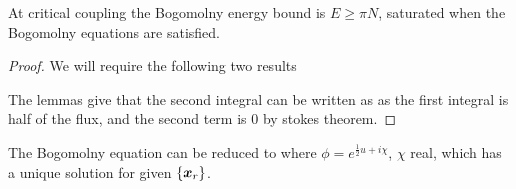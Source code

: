 \documentclass{article}
\begin{document}
\begin{prop}
At critical coupling the Bogomolny energy bound is $E \geq \pi N$, saturated when the Bogomolny equations
are satisfied.
\end{prop}
\begin{proof}
We will require the following two results 
\begin{lemma}
\end{lemma}
\begin{lemma}
\end{lemma}
The lemmas give that the second integral can be written as 
as the first integral is half of the flux, and the second term is 0 by stokes theorem. 
\end{proof}

\begin{theorem}
The Bogomolny equation can be reduced to 
where $\phi = e^{\frac{1}{2}u + i \chi}$, $\chi$ real, which has a unique solution for given $\left\{ \bm{x}_r \right\}$. 
\end{theorem}
\end{document}
